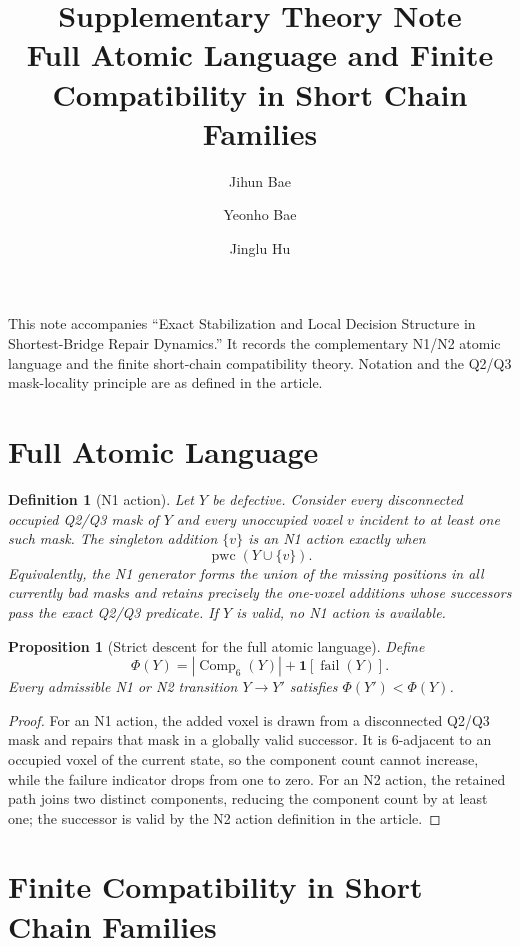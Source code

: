 \documentclass[11pt]{article}
\title{Supplementary Theory Note\\\large Full Atomic Language and Finite Compatibility in Short Chain Families}
\author{Jihun Bae \and Yeonho Bae \and Jinglu Hu}
\date{}
\newcommand{\Comp}{\operatorname{Comp}_6}
\newcommand{\pwc}{\operatorname{pwc}}
\newtheorem{proposition}[theorem]{Proposition}
\newtheorem{definition}[theorem]{Definition}
\begin{document}
\maketitle
\noindent This note accompanies ``Exact Stabilization and Local Decision Structure in Shortest-Bridge Repair Dynamics.'' It records the complementary N1/N2 atomic language and the finite short-chain compatibility theory. Notation and the Q2/Q3 mask-locality principle are as defined in the article.

\section{Full Atomic Language}

\begin{definition}[N1 action]\label{def:n1-action}
Let $Y$ be defective.  Consider every disconnected occupied Q2/Q3 mask of
$Y$ and every unoccupied voxel $v$ incident to at least one such mask.  The
singleton addition $\{v\}$ is an N1 action exactly when
\[
  \pwc(Y\cup\{v\}).
\]
Equivalently, the N1 generator forms the union of the missing positions in
all currently bad masks and retains precisely the one-voxel additions whose
successors pass the exact Q2/Q3 predicate.  If $Y$ is valid, no N1 action is
available.
\end{definition}

\begin{proposition}[Strict descent for the full atomic language]
\label{prop:full-atomic-descent}
Define
\[
 \Phi(Y)=|\Comp(Y)|+\mathbf 1[\operatorname{fail}(Y)].
\]
Every admissible N1 or N2 transition $Y\to Y'$ satisfies
$\Phi(Y')<\Phi(Y)$.
\end{proposition}

\begin{proof}
For an N1 action, the added voxel is drawn from a disconnected Q2/Q3 mask and
repairs that mask in a globally valid successor.  It is $6$-adjacent to an
occupied voxel of the current state, so the component count cannot increase,
while the failure indicator drops from one to zero.  For an N2 action, the
retained path joins two distinct components, reducing the component count by
at least one; the successor is valid by the N2 action definition in the article.
\end{proof}

\section{Finite Compatibility in Short Chain Families}
\end{document}
